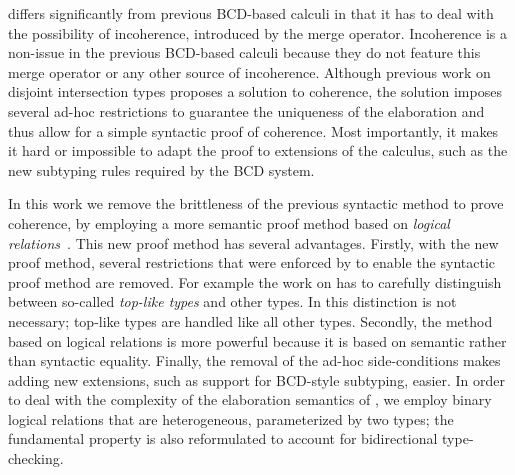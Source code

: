 
\name differs significantly from previous BCD-based calculi in that it has to
deal with the possibility of incoherence, introduced by the merge operator. Incoherence
is a non-issue in the previous BCD-based calculi because they do not feature
this merge operator or any other source of incoherence.
Although previous work on disjoint intersection types
proposes a solution to coherence, the solution imposes several ad-hoc restrictions
to guarantee the uniqueness of the elaboration and thus allow for a simple
syntactic proof of coherence. Most
importantly, it makes it hard or impossible to adapt the proof to extensions of
the calculus, such as the new subtyping rules required by the BCD system.

In this work we remove the brittleness of the previous syntactic method to prove
coherence, by employing a more semantic proof method based on \emph{logical
  relations}~\cite{tait, plotkin1973lambda, statman1985logical}. This new proof method has several
advantages. Firstly, with the new proof method, several restrictions that were
enforced by \oname to enable the syntactic proof method are removed. For example
the work on \oname has to carefully distinguish between so-called \emph{top-like
  types} and other types. 
In \name this distinction is not necessary; top-like types are handled like all
other types. Secondly, the method based on logical relations is more powerful
because it is based on semantic rather than syntactic equality. Finally, the
removal of the ad-hoc side-conditions makes adding new extensions, such as
support for BCD-style subtyping, easier. In order to deal with the complexity of
the elaboration semantics of \name, we employ binary logical relations that are
heterogeneous, parameterized by two types; the fundamental property is also
reformulated to account for bidirectional type-checking.

\begin{comment}
\tom{We need to be careful about how to formulate the above. The proof
     method itself is not novel. What is novel is that we use it for
     this purpose.}
\jeremy{adding to tom's comment, the novelty lines in the
     design of the logical relations that are tightly related to the disjointness
     judgment, esp the relation of products. Also, compared with traditional logical
     relations, there are two differences: 1) traditional logical
     relations are usually indexed by one type, ours are heterogeneous,
     parameterized by two types; 2) fundamental property doesn't hold in our
     target language  }
\end{comment}

